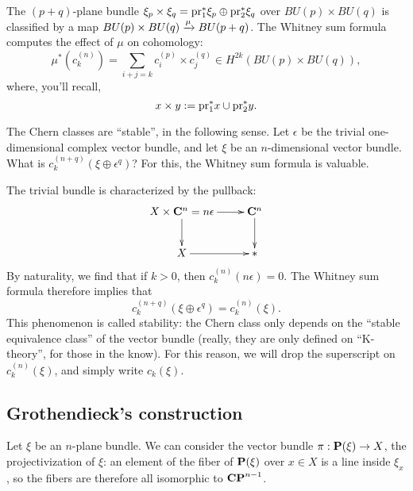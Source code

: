\begin{remark}
    The $(p+q)$-plane bundle $\xi_p\times \xi_q = \mathrm{pr}_1^\ast \xi_p\oplus
    \mathrm{pr}_2^\ast\xi_q$ over $BU(p)\times BU(q)$ is classified by a map
    $BU(p)\times BU(q) \xrightarrow{{\mu}} BU(p+q)$. The Whitney sum formula computes the
    effect of $\mu$ on cohomology:
    $$\mu^\ast(c^{(n)}_k) = \sum_{i+j = k} c^{(p)}_i \times c^{(q)}_j \in
    H^{2k}(BU(p)\times BU(q)),$$
    where, you'll recall,
    $$x\times y := \mathrm{pr}_1^\ast x \cup \mathrm{pr}_2^\ast y.$$
\end{remark}

The Chern classes are ``stable'', in the following sense. Let $\epsilon$ be the
trivial one-dimensional complex vector bundle, and let $\xi$ be an
$n$-dimensional vector bundle. What is $c^{(n+q)}_k(\xi\oplus\epsilon^q)$? For
this, the Whitney sum formula is valuable.

The trivial bundle is characterized by the pullback:
\begin{equation*}
    \xymatrix{
	X\times \cC^n = n\epsilon \ar[r]\ar[d] & \cC^n\ar[d]\\
	X\ar[r] & \ast
    }
\end{equation*}
By naturality, we find that if $k>0$, then $c^{(n)}_k(n\epsilon) = 0$. The
Whitney sum formula therefore implies that
$$c^{(n+q)}_k(\xi\oplus \epsilon^q) = c^{(n)}_k(\xi).$$
This phenomenon is called stability: the Chern class only depends on the
``stable equivalence class'' of the vector bundle (really, they are only
defined on ``K-theory'', for those in the know). For this reason, we will drop
the superscript on $c^{(n)}_k(\xi)$, and simply write $c_k(\xi)$.

\subsection{Grothendieck's construction}\label{grothendieck-chern}
Let $\xi$ be an $n$-plane bundle. We can consider the vector bundle
$\pi:\mathbf P(\xi)\to X$, the projectivization of $\xi$: an element of the fiber of
$\mathbf P(\xi)$ over $x\in X$ is a line inside $\xi_x$, so the fibers are therefore
all isomorphic to $\mathbf{CP}^{n-1}$.


